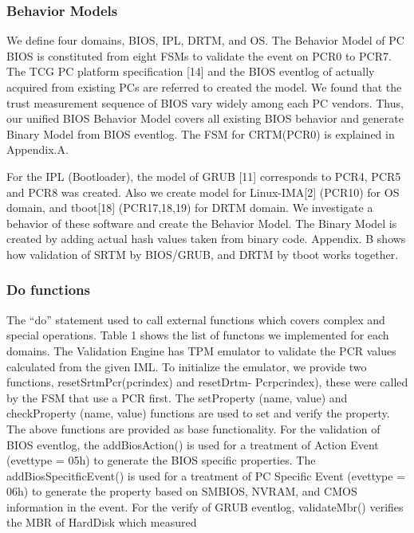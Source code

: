 \documentclass[12pt,a4paper]{article}
\begin{document}
\subsubsection{Behavior Models}  

We define four domains, BIOS, IPL, DRTM, and OS. The Behavior Model of PC BIOS is constituted
from eight FSMs to validate the event on PCR0 to PCR7. The TCG PC platform specification [14]
and the BIOS eventlog of actually acquired from existing PCs are referred to created the model. We
found that the trust measurement sequence of BIOS vary widely among each PC vendors. Thus,
our unified BIOS Behavior Model covers all existing BIOS behavior and generate Binary Model
from BIOS eventlog. The FSM for CRTM(PCR0) is explained in Appendix.A.

   For the IPL (Bootloader), the model of GRUB [11] corresponds to PCR4, PCR5 and PCR8
was created. Also we create model for Linux-IMA[2] (PCR10) for OS domain, and tboot[18]
(PCR17,18,19) for DRTM domain. We investigate a behavior of these software and create the
Behavior Model. The Binary Model is created by adding actual hash values taken from binary
code. Appendix. B shows how validation of SRTM by BIOS/GRUB, and DRTM by tboot works
together.



\subsubsection{Do functions}  

The “do” statement used to call external functions which covers complex and special operations.
Table 1 shows the list of functons we implemented for each domains.
   The Validation Engine has TPM emulator to validate the PCR values calculated from the given
IML. To initialize the emulator, we provide two functions, resetSrtmPcr(pcrindex) and resetDrtm-
Pcrpcrindex), these were called by the FSM that use a PCR first. The setProperty (name, value)
and checkProperty (name, value) functions are used to set and verify the property. The above
functions are provided as base functionality.
   For the validation of BIOS eventlog, the addBiosAction() is used for a treatment of Action
Event (evettype = 05h) to generate the BIOS specific properties. The addBiosSpecitficEvent() is
used for a treatment of PC Specific Event (evettype = 06h) to generate the property based on
SMBIOS, NVRAM, and CMOS information in the event.
   For the verify of GRUB eventlog, validateMbr() verifies the MBR of HardDisk which measured
\end{document}
